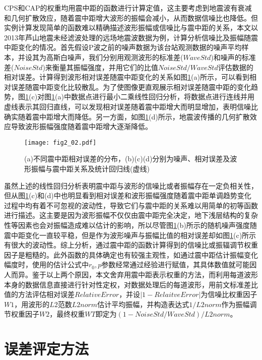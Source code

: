 CPS和CAP的权重均用震中距的函数进行计算定值，这主要考虑到地震波有衰减和几何扩散效应，随着震中距增大波形的振幅会减小，从而数据信噪比也降低。但实例计算发现简单的函数难以精确描述波形振幅或信噪比与震中距的关系，本文以2013年芦山地震未经滤波处理的远场地震波数据为例，计算分析信噪比及振幅随震中距变化的情况。首先假设P波之前的噪声数据为该台站观测数据的噪声平均样本，并设其为高斯白噪声，我们分别用观测波形的标准差($WaveStd$)和噪声的标准差($NoiseStd$)来衡量其振幅强度，并用它们的比值$NoiseStd/WaveStd$评估数据的相对误差。计算得到波形相对误差随震中距变化的关系如图\ref{fig2_02}(a)所示，可以看到相对误差随震中距变化比较散乱。为了使图像更直观展示相对误差随震中距的变化趋势，图\ref{fig2_02}(c)对图\ref{fig2_02}(a)中数据点进行最小二乘线性回归分析，将数据点进行连线并用虚线表示其回归直线，可以发现相对误差随着震中距增大而明显增加，表明信噪比确实随着震中距增大而降低。另一方面，如图\ref{fig2_02}(d)所示，地震波传播的几何扩散效应导致波形振幅强度随着震中距增大逐渐降低。
\begin{figure}
\centering
  \texttt{[image: fig2\_02.pdf]} 
  \caption{(a)不同震中距相对误差的分布，(b)(c)(d)分别为噪声、相对误差及波形振幅与震中距关系及统计回归线(虚线)}
  \label{fig2_02}
\end{figure}

虽然上述的线性回归分析表明震中距与波形的信噪比或者振幅存在一定负相关性，但从图\ref{fig2_02}(c)和(d)中也明显看到相对误差和波形振幅强度随着震中距单调趋势变化过程中均有着不可忽视的波动性，导致它们与震中距的关系难以用简单的初等函数进行描述。这主要是因为波形振幅不仅仅由震中距完全决定，地下浅层结构的复杂性等因素也会对振幅造成难以估计的影响，所以尽管图\ref{fig2_02}(b)所示的随机噪声强度随震中距变化一直较平稳，但是作为波形噪声与振幅比值的相对误差却如图\ref{fig2_02}(c)所示有很大的波动性。综上分析，通过震中距的函数计算得到的信噪比或振辐调节权重因子是粗糙的。此外函数的具体确定也有较强主观性，如\citet{Zhu1996}通过震中距估计振幅变化幅度时，使用的估计公式中$r_0,p$参数经常通过经验进行赋值，其具体数值就可能因人而异。鉴于以上两个原因，本文舍弃用震中距表示权重的方法，而利用每道波形本身的数据信息直接进行针对性定权，对数据处理后的每道波形，用前文标准差比值的方法评估相对误差$RelativeError$，并设$|1-RelaitveError|$为信噪比权重因子$W1$，用波形的$L2$范数$L2norm$估计平均振幅，并构造表达式$1/L2norm$作为振幅调节权重因子$W2$，最终权重$WT$即定为$(1-NoiseStd/WaveStd)/L2norm$。

\section{误差评定方法}

